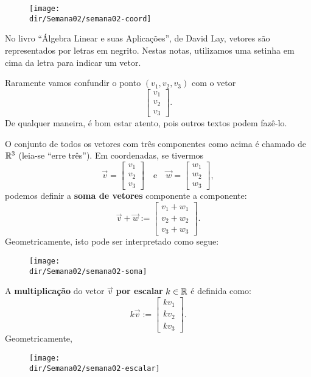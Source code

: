 \documentclass[../livro.tex]{subfiles}  %
\providecommand{\dir}{..}
\begin{document}
\begin{figure}[h!]
\begin{center}
\texttt{[image: \\dir/Semana02/semana02-coord]}
\end{center}
\end{figure}

No livro ``Álgebra Linear e suas Aplicações'', de David Lay, vetores são representados por letras em negrito. Nestas notas, utilizamos uma setinha em cima da letra para indicar um vetor.

Raramente vamos confundir o ponto $(v_1, v_2, v_3)$ com o vetor
\[
\left[
\begin{array}{c}
v_1 \\
v_2 \\
v_3
\end{array}
\right].
\] De qualquer maneira, é bom estar atento, pois outros textos podem fazê-lo.

O conjunto de todos os vetores com três componentes como acima é chamado de $\mathbb{R}^3$ (leia-se ``erre três''). Em coordenadas, se tivermos
\[
\vec{v} =
\left[
  \begin{array}{c}
    v_1 \\
    v_2 \\
    v_3
  \end{array}
\right]  \quad  \text{e} \quad
\vec{w} =
\left[
  \begin{array}{c}
    w_1 \\
    w_2 \\
    w_3
  \end{array}
\right],
\] podemos definir a \textbf{soma de vetores} componente a componente:
\[
\vec{v} + \vec{w} :=
\left[
  \begin{array}{c}
    v_1 + w_1 \\
    v_2 + w_2 \\
    v_3 + w_3
  \end{array}
\right].
\] Geometricamente, isto pode ser interpretado como segue:
\begin{figure}[h!]
\begin{center}
\texttt{[image: \\dir/Semana02/semana02-soma]}
\end{center}
\end{figure}

A \textbf{multiplicação} do vetor $\vec{v}$ \textbf{por escalar} $k \in \mathbb{R}$ é definida como:
\[
k \vec{v} :=
\left[
  \begin{array}{c}
    k v_1 \\
    k v_2 \\
    k v_3
  \end{array}
\right].
\] Geometricamente,
\begin{figure}[h!]
\begin{center}
\texttt{[image: \\dir/Semana02/semana02-escalar]}
\end{center}
\end{figure}
\end{document}

